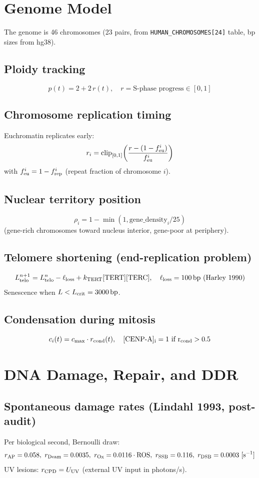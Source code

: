 \documentclass[11pt,a4paper]{article}
\newcommand{\eq}[1]{\begin{equation}#1\end{equation}}
\begin{document}
\clearpage
\section{Genome Model}
\label{sec:genome}
The genome is 46 chromosomes (23 pairs, from \texttt{HUMAN\_CHROMOSOMES[24]} table, bp sizes from hg38).

\subsection{Ploidy tracking}
\eq{ p(t) = 2+2\,r(t),\quad r=\text{S-phase progress}\in[0,1] }

\subsection{Chromosome replication timing}
Euchromatin replicates early:
\eq{ r_i = \mathrm{clip}_{[0,1]}\!\left(\frac{r-(1-f_{\rm eu}^i)}{f_{\rm eu}^i}\right) }
with $f_{\rm eu}^i = 1 - f_{\rm rep}^i$ (repeat fraction of chromosome $i$).

\subsection{Nuclear territory position}
\eq{ \rho_i = 1 - \min(1, \mathrm{gene\_density}_i / 25) }
(gene-rich chromosomes toward nucleus interior, gene-poor at periphery).

\subsection{Telomere shortening (end-replication problem)}
\eq{ L^{n+1}_{\rm telo} = L^n_{\rm telo} - \ell_{\rm loss} + k_{\rm TERT}[\rm TERT][\rm TERC],\quad \ell_{\rm loss}=\SI{100}{bp}\ (\text{Harley 1990}) }
Senescence when $L<L_{\rm crit}=\SI{3000}{bp}$.

\subsection{Condensation during mitosis}
\eq{ c_i(t) = c_{\rm max}\cdot r_{\rm cond}(t),\quad [\rm CENP\text{-}A]_i=1\ \text{if}\ r_{\rm cond}>0.5 }

\clearpage
\section{DNA Damage, Repair, and DDR}
\label{sec:dna}

\subsection{Spontaneous damage rates (Lindahl 1993, post-audit)}
Per biological second, Bernoulli draw:
\[
r_{\rm AP}=0.058,\ r_{\rm Deam}=0.0035,\ r_{\rm Ox}=0.0116\cdot\mathrm{ROS},\ r_{\rm SSB}=0.116,\ r_{\rm DSB}=0.0003\ [\si{s^{-1}}]
\]
UV lesions: $r_{\rm CPD}=U_{\rm UV}$ (external UV input in photons/s).
\end{document}
